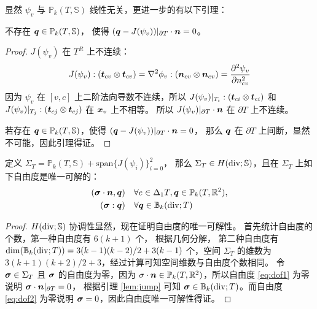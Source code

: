 \documentclass[letterpaper,12pt]{article}
\begin{document}
显然 $\psi_v$ 与 $\mathbb{P}_k(T, \mathbb{S})$ 线性无关，更进一步的有以下引理：
\begin{lemma}
\label{lem:jump}
    不存在 $\boldsymbol{q} \in \mathbb{P}_k(T, \mathbb{S})$，
    使得 $(\boldsymbol{q} - J(\psi_v))|_{\partial T}\cdot \boldsymbol{n} = 0$。
\end{lemma}
\begin{proof}
$J(\psi_v)$ 在 $T^R$ 上不连续：
$$
J(\psi_v) : (\boldsymbol{t}_{cv}\otimes \boldsymbol{t}_{cv}) = 
\nabla^2 \phi_v : (\boldsymbol{n}_{cv}\otimes \boldsymbol{n}_{cv}) = \frac{\partial^2 \psi_v}{
\partial n_{cv}^2}
$$
因为 $\psi_v$ 在 $[v, c]$ 上二阶法向导数不连续，所以 
$J(\psi_v)|_{T_i}:
(\boldsymbol{t}_{ci}\otimes \boldsymbol{t}_{ci})$ 和 $J(\psi_v)|_{T_j}:
(\boldsymbol{t}_{cj}\otimes \boldsymbol{t}_{cj})$ 在 $\boldsymbol{x}_v$ 上不相等。
所以 $J(\psi_v)|_{\partial T}\cdot \boldsymbol{n}$ 在 $\partial T$ 上不连续。

若存在 $\boldsymbol{q} \in \mathbb{P}_k(T, \mathbb{S})$，使得 
$(\boldsymbol{q} - J(\psi_v))|_{\partial T}\cdot \boldsymbol{n} = 0$，
那么 $\boldsymbol{q}$ 在 $\partial T$ 上间断，显然不可能，因此引理得证。
\end{proof}

\begin{theorem}
\label{thm:hdivsdof2d}
    定义 $\Sigma_T = \mathbb{P}_k(T, \mathbb{S}) + 
    \mathrm{span}\{J(\psi_i)\}_{i=0}^2$，
    那么 $\Sigma_T \in H(\operatorname{div}; \mathbb{S})$，且在 $\Sigma_T$ 上如下自由度是唯一可解的：
    \begin{align}
        (\boldsymbol{\sigma}\cdot \boldsymbol{n}, \boldsymbol{q})  & \quad \forall e \in
        \Delta_1 T, \boldsymbol{q} \in \mathbb{P}_k(T, \mathbb{R}^2), \label{eq:dof1}\\
    (\boldsymbol{\sigma} : \boldsymbol{q}) & \quad \forall \boldsymbol{q} \in
    \mathbb{B}_k(\operatorname{div}; T)\label{eq:dof2}
    \end{align}
\end{theorem}
\begin{proof}
    $H(\operatorname{div}; \mathbb{S})$ 协调性显然，现在证明自由度的唯一可解性。
    首先统计自由度的个数，第一种自由度有 $6(k+1)$ 个，
    根据几何分解，
    第二种自由度有
    $\mathrm{dim}(\mathbb{B}_k(\operatorname{div}; T)) = 3(k-1)(k-2)/2 + 3(k-1)$ 个，空间
    $\Sigma_T$ 的维数为 $3(k+1)(k+2)/2 + 3$，经过计算可知空间维数与自由度个数相同。
    令 $\boldsymbol{\sigma} \in \Sigma_T$ 且 $\boldsymbol{\sigma}$ 的自由度为零，因为 $\sigma \cdot \boldsymbol{n}\in
    \mathbb{P}_k(T, \mathbb{R}^2)$，所以自由度 \eqref{eq:dof1} 
    为零说明 $\boldsymbol{\sigma} \cdot \boldsymbol{n}
    |_{\partial T} = 0$，
    根据引理 \ref{lem:jump} 可知
    $\boldsymbol{\sigma} \in \mathbb{B}_k(\operatorname{div};
    T)$。而自由度 \eqref{eq:dof2} 为零说明 $\boldsymbol{\sigma} = 0$，因此自由度唯一可解性得证。
\end{proof}
\end{document}
